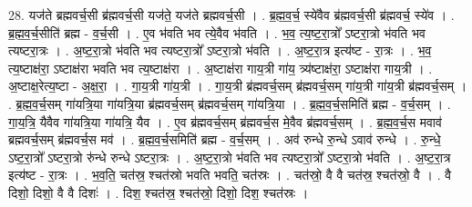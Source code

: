 \documentclass[17pt]{extarticle}
\begin{document}
28. यज॑ते ब्रह्मवर्च॒सी ब्र॑ह्मवर्च॒सी यज॑ते॒ यज॑ते ब्रह्मवर्च॒सी । . ब्र॒ह्म॒व॒र्च॒ स्ये॑वैव ब्र॑ह्मवर्च॒सी ब्र॑ह्मवर्च॒ स्ये॑व । . ब्र॒ह्म॒व॒र्च॒सीति॑ ब्रह्म - व॒र्च॒सी । . ए॒व भ॑वति भव त्ये॒वैव भ॑वति । . भ॒व॒ त्य॒ष्ट॒रा॒त्रो᳚ ऽष्टरा॒त्रो भ॑वति भव त्यष्टरा॒त्रः । . अ॒ष्ट॒रा॒त्रो भ॑वति भव त्यष्टरा॒त्रो᳚ ऽष्टरा॒त्रो भ॑वति । . अ॒ष्ट॒रा॒त्र इत्य॑ष्ट - रा॒त्रः । . भ॒व॒ त्य॒ष्टाक्ष॑रा॒ ऽष्टाक्ष॑रा भवति भव त्य॒ष्टाक्ष॑रा । . अ॒ष्टाक्ष॑रा गाय॒त्री गा॑य॒ त्र्य॑ष्टाक्ष॑रा॒ ऽष्टाक्ष॑रा गाय॒त्री । . अ॒ष्टाक्ष॒रेत्य॒ष्टा - अ॒क्ष॒रा॒ । . गा॒य॒त्री गा॑य॒त्री । . गा॒य॒त्री ब्र॑ह्मवर्च॒सम् ब्र॑ह्मवर्च॒सम् गा॑य॒त्री गा॑य॒त्री ब्र॑ह्मवर्च॒सम् । . ब्र॒ह्म॒व॒र्च॒सम् गा॑यत्रि॒या गा॑यत्रि॒या ब्र॑ह्मवर्च॒सम् ब्र॑ह्मवर्च॒सम् गा॑यत्रि॒या । . ब्र॒ह्म॒व॒र्च॒समिति॑ ब्रह्म - व॒र्च॒सम् । . गा॒य॒त्रि॒ यैवैव गा॑यत्रि॒या गा॑यत्रि॒ यैव । . ए॒व ब्र॑ह्मवर्च॒सम् ब्र॑ह्मवर्च॒स मे॒वैव ब्र॑ह्मवर्च॒सम् । . ब्र॒ह्म॒व॒र्च॒स मवाव॑ ब्रह्मवर्च॒सम् ब्र॑ह्मवर्च॒स मव॑ । . ब्र॒ह्म॒व॒र्च॒समिति॑ ब्रह्म - व॒र्च॒सम् । . अव॑ रुन्धे रु॒न्धे ऽवाव॑ रुन्धे । . रु॒न्धे॒ ऽष्ट॒रा॒त्रो᳚ ऽष्टरा॒त्रो रु॑न्धे रुन्धे ऽष्टरा॒त्रः । . अ॒ष्ट॒रा॒त्रो भ॑वति भव त्यष्टरा॒त्रो᳚ ऽष्टरा॒त्रो भ॑वति । . अ॒ष्ट॒रा॒त्र इत्य॑ष्ट - रा॒त्रः । . भ॒व॒ति॒ चत॑स्र॒ श्चत॑स्रो भवति भवति॒ चत॑स्रः । . चत॑स्रो॒ वै वै चत॑स्र॒ श्चत॑स्रो॒ वै । . वै दिशो॒ दिशो॒ वै वै दिशः॑ । . दिश॒ श्चत॑स्र॒ श्चत॑स्रो॒ दिशो॒ दिश॒ श्चत॑स्रः । \newline
\end{document}
